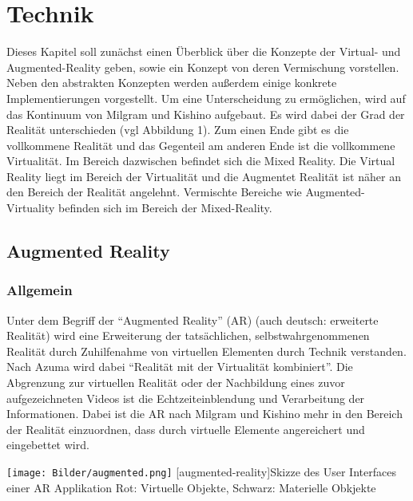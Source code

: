 \documentclass[12pt,a4paper,bibliography=totocnumbered,listof=totocnumbered]{scrartcl}
\begin{document}
\section{Technik}
Dieses Kapitel soll zunächst einen Überblick über die Konzepte der Virtual- und Augmented-Reality geben, sowie ein Konzept von deren Vermischung vorstellen. Neben den abstrakten Konzepten werden außerdem einige konkrete Implementierungen vorgestellt.  Um eine Unterscheidung zu ermöglichen, wird auf das Kontinuum von Milgram und Kishino aufgebaut. Es wird dabei der Grad der Realität unterschieden (vgl Abbildung 1). Zum einen Ende gibt es die vollkommene Realität und das Gegenteil am anderen Ende ist die vollkommene Virtualität. Im Bereich dazwischen befindet sich die Mixed Reality. Die Virtual Reality liegt im Bereich der Virtualität und die Augmentet Realität ist näher an den Bereich der Realität angelehnt. Vermischte Bereiche wie Augmented-Virtuality befinden sich im Bereich der Mixed-Reality.
\subsection{Augmented Reality}
\subsubsection{Allgemein}
Unter dem Begriff der “Augmented Reality” (\ac{AR}) (auch deutsch: erweiterte Realität) wird eine Erweiterung der tatsächlichen, selbstwahrgenommenen Realität durch Zuhilfenahme von virtuellen Elementen durch Technik verstanden.
Nach Azuma wird dabei “Realität mit der Virtualität kombiniert”. Die Abgrenzung zur virtuellen Realität oder der Nachbildung eines zuvor aufgezeichneten Videos ist die Echtzeiteinblendung und Verarbeitung der Informationen. Dabei ist die AR nach Milgram und Kishino mehr in den Bereich der Realität einzuordnen, dass durch virtuelle Elemente angereichert und eingebettet wird.

\begin{minipage}{\linewidth}
\vspace{1em}
	\centering
	\texttt{[image: Bilder/augmented.png]}
	[augmented-reality]{Skizze des User Interfaces einer AR Applikation\newline
	Rot: Virtuelle Objekte, Schwarz: Materielle Obkjekte}
	\label{fig:augmented_reality}
\vspace{1em}
\end{minipage}
\end{document}
